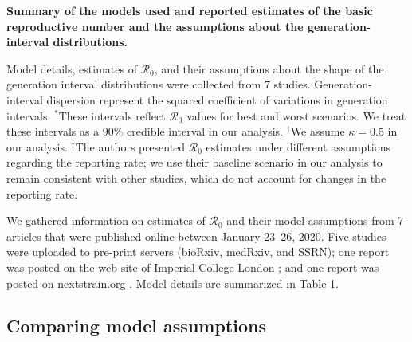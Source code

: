 \documentclass[12pt]{article}
\newcommand{\Ro}{\ensuremath{{\mathcal R}_{0}}\xspace}
\begin{document}
{\begin{landscape}
\begin{table}[!th]
\begin{center}
\end{center}
\caption{
\textbf{Summary of the models used and reported estimates of the basic reproductive number and the assumptions about the generation-interval distributions.}
}
Model details, estimates of \Ro, and their assumptions about the shape of the generation interval distributions were collected from 7 studies.
Generation-interval dispersion represent the squared coefficient of variations in generation intervals.
$^\ast$These intervals reflect \Ro values for best and worst scenarios. We treat these intervals as a 90\% credible interval in our analysis.
$^\dagger$We assume $\kappa = 0.5$ in our analysis.
$^\ddagger$The authors presented \Ro estimates under different assumptions regarding the reporting rate; we use their baseline scenario in our analysis to remain consistent with other studies, which do not account for changes in the reporting rate.
\end{table}
\end{landscape}
\clearpage
}

We gathered information on estimates of \Ro and their model assumptions from 7 articles that were published online between January 23--26, 2020.
Five studies \citep{liuncov, majumderncov, readncov, riouncov, zhaoncov} were uploaded to pre-print servers (bioRxiv, medRxiv, and SSRN); one report was posted on the web site of Imperial College London \citep{imaincov}; and one report was posted on \url{nextstrain.org} \citep{bedfordncov}.
Model details are summarized in Table 1.

\subsection{Comparing model assumptions}
\end{document}
